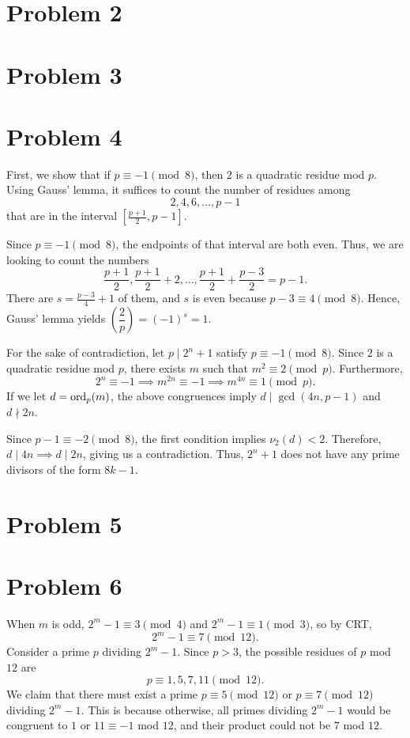\documentclass{scrartcl}
\begin{document}
\section*{Problem 2}
\pagebreak
\section*{Problem 3}
\pagebreak
\section*{Problem 4}
First, we show that if $p \equiv -1 \pmod{8}$, then $2$ is a quadratic residue mod $p$.
Using Gauss' lemma, it suffices to count the number of residues among
\[ 2, 4, 6, \ldots, p-1 \]
that are in the interval $[\frac{p+1}{2}, p-1]$.

Since $p \equiv -1 \pmod{8}$, the endpoints of that interval are both even.
Thus, we are looking to count the numbers
\[ \frac{p+1}{2}, \frac{p+1}{2} + 2, \ldots, \frac{p+1}{2} + \frac{p-3}{2} = p-1. \]
There are $s = \frac{p-3}{4} + 1$ of them, and $s$ is even because $p-3 \equiv 4 \pmod{8}$.
Hence, Gauss' lemma yields $\left(\dfrac{2}{p}\right) = (-1)^s = 1$.

For the sake of contradiction, let $p \mid 2^n + 1$ satisfy $p \equiv -1 \pmod{8}$.
Since $2$ is a quadratic residue mod $p$, there exists $m$ such that $m^2 \equiv 2 \pmod{p}$.
Furthermore,
\[ 2^n \equiv -1 \implies m^{2n} \equiv -1 \implies m^{4n} \equiv 1 \pmod{p}. \]
If we let $d = \operatorname{ord}_p(m)$, the above congruences imply $d \mid \gcd(4n, p-1)$ and $d \nmid 2n$.

Since $p-1 \equiv -2 \pmod{8}$, the first condition implies $\nu_2(d) < 2$.
Therefore, $d \mid 4n \implies d \mid 2n$, giving us a contradiction.
Thus, $2^n + 1$ does not have any prime divisors of the form $8k-1$.

\pagebreak
\section*{Problem 5}

\pagebreak
\section*{Problem 6}
When $m$ is odd, $2^m - 1 \equiv 3 \pmod{4}$ and $2^m - 1 \equiv 1 \pmod{3}$, so by CRT,
\[ 2^m - 1 \equiv 7 \pmod{12}. \]
Consider a prime $p$ dividing $2^m - 1$.
Since $p > 3$, the possible residues of $p$ mod $12$ are
\[ p \equiv 1,5,7,11\pmod{12}. \]
We claim that there must exist a prime $p \equiv 5 \pmod{12}$ or $p \equiv 7 \pmod{12}$ dividing $2^m - 1$.
This is because otherwise, all primes dividing $2^m-1$ would be congruent to $1$ or $11 \equiv -1$ mod $12$, and their product could not be $7$ mod $12$.
\end{document}
